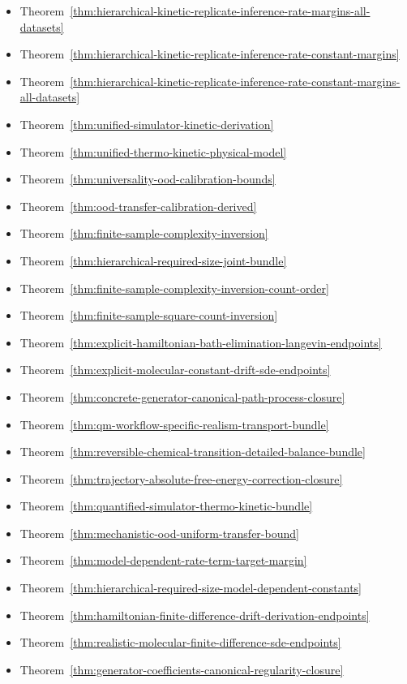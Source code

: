 \begin{itemize}
\item Theorem~\ref{thm:hierarchical-kinetic-replicate-inference-rate-margins-all-datasets}
\item Theorem~\ref{thm:hierarchical-kinetic-replicate-inference-rate-constant-margins}
\item Theorem~\ref{thm:hierarchical-kinetic-replicate-inference-rate-constant-margins-all-datasets}
\item Theorem~\ref{thm:unified-simulator-kinetic-derivation}
\item Theorem~\ref{thm:unified-thermo-kinetic-physical-model}
\item Theorem~\ref{thm:universality-ood-calibration-bounds}
\item Theorem~\ref{thm:ood-transfer-calibration-derived}
\item Theorem~\ref{thm:finite-sample-complexity-inversion}
\item Theorem~\ref{thm:hierarchical-required-size-joint-bundle}
\item Theorem~\ref{thm:finite-sample-complexity-inversion-count-order}
\item Theorem~\ref{thm:finite-sample-square-count-inversion}
\item Theorem~\ref{thm:explicit-hamiltonian-bath-elimination-langevin-endpoints}
\item Theorem~\ref{thm:explicit-molecular-constant-drift-sde-endpoints}
\item Theorem~\ref{thm:concrete-generator-canonical-path-process-closure}
\item Theorem~\ref{thm:qm-workflow-specific-realism-transport-bundle}
\item Theorem~\ref{thm:reversible-chemical-transition-detailed-balance-bundle}
\item Theorem~\ref{thm:trajectory-absolute-free-energy-correction-closure}
\item Theorem~\ref{thm:quantified-simulator-thermo-kinetic-bundle}
\item Theorem~\ref{thm:mechanistic-ood-uniform-transfer-bound}
\item Theorem~\ref{thm:model-dependent-rate-term-target-margin}
\item Theorem~\ref{thm:hierarchical-required-size-model-dependent-constants}
\item Theorem~\ref{thm:hamiltonian-finite-difference-drift-derivation-endpoints}
\item Theorem~\ref{thm:realistic-molecular-finite-difference-sde-endpoints}
\item Theorem~\ref{thm:generator-coefficients-canonical-regularity-closure}

\end{itemize}
